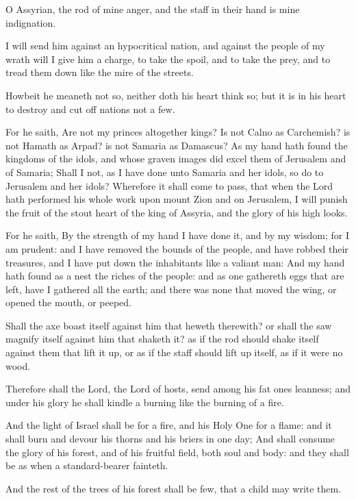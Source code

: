 \Verse O Assyrian, the rod of mine anger, and the staff in their hand is mine indignation.

\Verse I will send him against an hypocritical nation, and against the people of my wrath will I give him a charge, to take the spoil, and to take the prey, and to tread them down like the mire of the streets.

\Verse Howbeit he meaneth not so, neither doth his heart think so; but it is in his heart to destroy and cut off nations not a few.

\Verse For he saith, Are not my princes altogether kings?  \Verse Is not Calno as Carchemish? is not Hamath as Arpad? is not Samaria as Damascus?  \Verse As my hand hath found the kingdoms of the idols, and whose graven images did excel them of Jerusalem and of Samaria; \Verse Shall I not, as I have done unto Samaria and her idols, so do to Jerusalem and her idols?  \Verse Wherefore it shall come to pass, that when the Lord hath performed his whole work upon mount Zion and on Jerusalem, I will punish the fruit of the stout heart of the king of Assyria, and the glory of his high looks.

\Verse For he saith, By the strength of my hand I have done it, and by my wisdom; for I am prudent: and I have removed the bounds of the people, and have robbed their treasures, and I have put down the inhabitants like a valiant man: \Verse And my hand hath found as a nest the riches of the people: and as one gathereth eggs that are left, have I gathered all the earth; and there was none that moved the wing, or opened the mouth, or peeped.

\Verse Shall the axe boast itself against him that heweth therewith? or shall the saw magnify itself against him that shaketh it? as if the rod should shake itself against them that lift it up, or as if the staff should lift up itself, as if it were no wood.

\Verse Therefore shall the Lord, the Lord of hosts, send among his fat ones leanness; and under his glory he shall kindle a burning like the burning of a fire.

\Verse And the light of Israel shall be for a fire, and his Holy One for a flame: and it shall burn and devour his thorns and his briers in one day; \Verse And shall consume the glory of his forest, and of his fruitful field, both soul and body: and they shall be as when a standard-bearer fainteth.

\Verse And the rest of the trees of his forest shall be few, that a child may write them.

